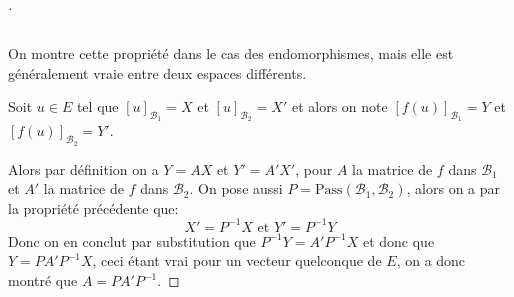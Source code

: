 \documentclass{report}
\begin{document}
   \begin{proof}[\unskip\nopunct]
      \subsection*{}
      On montre cette propriété dans le cas des endomorphismes, mais elle est généralement vraie entre deux espaces différents.\<

      Soit \(u \in E\) tel que \([u]_{\mathscr{B}_1} = X\) et \([u]_{\mathscr{B}_2} = X'\) et alors on note \([f(u)]_{\mathscr{B}_1} = Y\) et \([f(u)]_{\mathscr{B}_2} = Y'\).\<

      Alors par définition on a \(Y = AX\) et \(Y' = A'X'\), pour \(A\) la matrice de \(f\) dans \(\mathscr{B}_1\) et \(A'\) la matrice de \(f\) dans \(\mathscr{B}_2\). On pose aussi \(P = \text{Pass}(\mathscr{B}_1, \mathscr{B}_2)\), alors on a par la propriété précédente que:
      \[
         X' = P^{-1}X \text{ et } Y' = P^{-1}Y
      \]
      Donc on en conclut par substitution que \(P^{-1}Y = A'P^{-1}X\) et donc que \(Y = PA'P^{-1}X\), ceci étant vrai pour un vecteur quelconque de \(E\), on a donc montré que \(A = PA'P^{-1}\).
   \end{proof}
\end{document}
